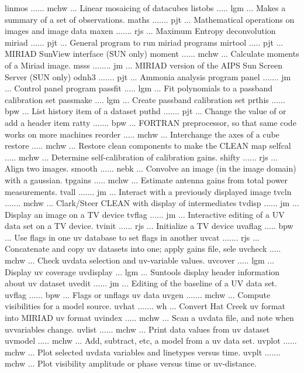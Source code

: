 {\eightpoint\begintt
linmos ...... mchw ... Linear mosaicing of datacubes 
listobs ..... lgm  ... Makes a summary of a set of observations. 
maths ....... pjt  ... Mathematical operations on images and image data 
maxen ....... rjs  ... Maximum Entropy deconvolution 
miriad ...... pjt  ... General program to run miriad programs 
\endtt}
{\eightpoint\begintt
mirtool ..... pjt  ... MIRIAD SunView interface (SUN only) 
moment ...... mchw ... Calculate moments of a Miriad image. 
msss ........ jm   ... MIRIAD version of the AIPS Sun Screen Server (SUN only) 
odnh3 ....... pjt  ... Ammonia analysis program 
panel ....... jm   ... Control panel program 
\endtt}
{\eightpoint\begintt
passfit ..... lgm  ... Fit polynomials to a passband calibration set 
passmake .... lgm  ... Create passband calibration set 
prthis ...... bpw  ... List history item of a dataset 
puthd ....... pjt  ... Change the value of or add a header item 
ratty ....... bpw  ... FORTRAN preprocessor, so that same code works on more machines 
\endtt}
{\eightpoint\begintt
reorder ..... mchw ... Interchange the axes of a cube 
restore ..... mchw ... Restore clean components to make the CLEAN map 
selfcal ..... mchw ... Determine self-calibration of calibration gains. 
shifty ...... rjs  ... Align two images. 
smooth ...... nebk ... Convolve an image (in the image domain) with a gaussian. 
\endtt}
{\eightpoint\begintt
tpgains ..... mchw ... Estimate antenna gains from total power measurements. 
tvall ....... jm   ... Interact with a previously displayed image 
tvcln ....... mchw ... Clark/Steer CLEAN with display of intermediates 
tvdisp ...... jm   ... Display an image on a TV device 
tvflag ...... jm   ... Interactive editing of a UV data set on a TV device. 
\endtt}
{\eightpoint\begintt
tvinit ...... rjs  ... Initialize a TV device 
uvaflag ..... bpw  ... Use flags in one uv database to set flags in another 
uvcat ....... rjs  ... Concatenate and copy uv datasets into one; apply gains file, sele 
uvcheck ..... mchw ... Check uvdata selection and uv-variable values. 
uvcover ..... lgm  ... Display uv coverage 
\endtt}
{\eightpoint\begintt
uvdisplay ... lgm  ... Suntools display header information about uv dataset 
uvedit ...... jm   ... Editing of the baseline of a UV data set. 
uvflag ...... bpw  ... Flags or unflags uv data 
uvgen ....... mchw ... Compute visibilities for a model source. 
uvhat ....... wh   ... Convert Hat Creek uv format into MIRIAD uv format 
\endtt}
{\eightpoint\begintt
uvindex ..... mchw ... Scan a uvdata file, and note when uvvariables change. 
uvlist ...... mchw ... Print data values from uv dataset 
uvmodel ..... mchw ... Add, subtract, etc, a model from a uv data set. 
uvplot ...... mchw ... Plot selected uvdata variables and linetypes versus time.
uvplt ....... mchw ... Plot visibility amplitude or phase versus time or uv-distance. 
\endtt}
